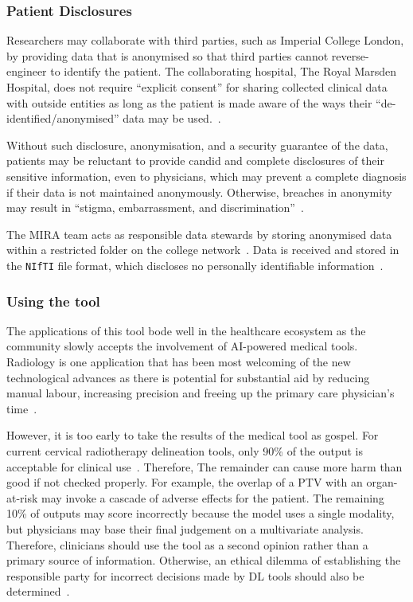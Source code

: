 \documentclass[11pt,twoside]{report}
\begin{document}
\subsubsection{Patient Disclosures}

Researchers may collaborate with third parties, such as Imperial College London, by providing data that is anonymised so that third parties cannot reverse-engineer to identify the patient. The collaborating hospital, The Royal Marsden Hospital, does not require ``explicit consent'' for sharing collected clinical data with outside entities as long as the patient is made aware of the ways their ``de-identified/anonymised'' data may be used.~\cite{royal-marsden-privacy-note}. 

Without such disclosure, anonymisation, and a security guarantee of the data, patients may be reluctant to provide candid and complete disclosures of their sensitive information, even to physicians, which may prevent a complete diagnosis if their data is not maintained anonymously. Otherwise, breaches in anonymity may result in ``stigma, embarrassment, and discrimination''~\cite{health-privacy}.

The MIRA team acts as responsible data stewards by storing anonymised data within a restricted folder on the college network~\cite{Larson2020-ib}. Data is received and stored in the \texttt{NIfTI} file format, which discloses no personally identifiable information~\cite{gov-gdpr}.

\subsubsection{Using the tool}

The applications of this tool bode well in the healthcare ecosystem as the community slowly accepts the involvement of AI-powered medical tools. Radiology is one application that has been most welcoming of the new technological advances as there is potential for substantial aid by reducing manual labour, increasing precision and freeing up the primary care physician's time~\cite{Amisha2019-ki}.

However, it is too early to take the results of the medical tool as gospel. For current cervical radiotherapy delineation tools, only 90\% of the output is acceptable for clinical use~\cite{LIU2020172}. Therefore, The remainder can cause more harm than good if not checked properly. For example, the overlap of a PTV with an organ-at-risk may invoke a cascade of adverse effects for the patient. The remaining 10\% of outputs may score incorrectly because the model uses a single modality, but physicians may base their final judgement on a multivariate analysis. Therefore, clinicians should use the tool as a second opinion rather than a primary source of information. Otherwise, an ethical dilemma of establishing the responsible party for incorrect decisions made by DL tools should also be determined~\cite{Chen2021-dg}.
\end{document}
